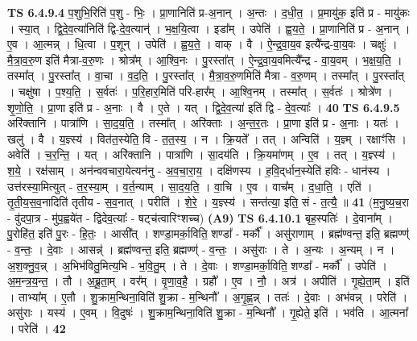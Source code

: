 \documentclass[17pt]{extarticle}
\begin{document}
                  \newline
                                \textbf{ TS 6.4.9.4} \newline
                  प॒शुभि॒रिति॑ प॒शु - भिः॒ । प्रा॒णानिति॑ प्र-अ॒नान् । अ॒न्तः । द॒धी॒त॒ । प्र॒मायु॑क॒ इति॑ प्र - मायु॑कः । स्या॒त् । द्वि॒दे॒व॒त्या॑निति॑ द्वि-दे॒व॒त्यान्॑ । भ॒क्ष॒यि॒त्वा । इडा᳚म् । उपेति॑ । ह्व॒य॒ते॒ । प्रा॒णानिति॑ प्र - अ॒नान् । ए॒व । आ॒त्मन्न् । धि॒त्वा । प॒शून् । उपेति॑ । ह्व॒य॒ते॒ । वाक् । वै । ऐ॒न्द्र॒वा॒य॒व इत्यै᳚न्द्र-वा॒य॒वः । चक्षुः॑ । मै॒त्रा॒व॒रु॒ण इति॑ मैत्रा-व॒रु॒णः । श्रोत्र᳚म् । आ॒श्वि॒नः । पु॒रस्ता᳚त् । ऐ॒न्द्र॒वा॒य॒वमित्यै᳚न्द्र - वा॒य॒वम् । भ॒क्ष॒य॒ति॒ । तस्मा᳚त् । पु॒रस्ता᳚त् । वा॒चा । व॒द॒ति॒ । पु॒रस्ता᳚त् । मै॒त्रा॒व॒रु॒णमिति॑ मैत्रा - व॒रु॒णम् । तस्मा᳚त् । पु॒रस्ता᳚त् । चक्षु॑षा । प॒श्य॒ति॒ । स॒र्वतः॑ । प॒रि॒हार॒मिति॑ परि-हार᳚म् । आ॒श्वि॒नम् । तस्मा᳚त् । स॒र्वतः॑ । श्रोत्रे॑ण । शृ॒णो॒ति॒ । प्रा॒णा इति॑ प्र - अ॒नाः । वै । ए॒ते । यत् । द्वि॒दे॒व॒त्या॑ इति॑ द्वि - दे॒व॒त्याः᳚ । \textbf{  40} \newline
                  \newline
                                \textbf{ TS 6.4.9.5} \newline
                  अरि॑क्तानि । पात्रा॑णि । सा॒द॒य॒ति॒ । तस्मा᳚त् । अरि॑क्ताः । अ॒न्त॒र॒तः । प्रा॒णा इति॑ प्र - अ॒नाः । यतः॑ । खलु॑ । वै । य॒ज्ञ्स्य॑ । वित॑त॒स्येति॒ वि - त॒त॒स्य॒ । न । क्रि॒यते᳚ । तत् । अन्विति॑ । य॒ज्ञ्म् । रक्षाꣳ॑सि । अवेति॑ । च॒र॒न्ति॒ । यत् । अरि॑क्तानि । पात्रा॑णि । सा॒दय॑ति । क्रि॒यमा॑णम् । ए॒व । तत् । य॒ज्ञ्स्य॑ । श॒ये॒ । रक्ष॑साम् । अन॑न्ववचारा॒येत्यन॑नु - अ॒व॒चा॒रा॒य॒ । दक्षि॑णस्य । ह॒वि॒द्‌र्धान॒स्येति॑ हविः - धान॑स्य । उत्त॑रस्या॒मित्युत् - त॒र॒स्या॒म् । व॒र्त॒न्याम् । सा॒द॒य॒ति॒ । वा॒चि । ए॒व । वाच᳚म् । द॒धा॒ति॒ । एति॑ । तृ॒ती॒य॒स॒व॒नादिति॑ तृतीय - स॒व॒नात् । परीति॑ । शे॒रे॒ । य॒ज्ञ्स्य॑ । सन्त॑त्या॒ इति॒ सं - त॒त्यै॒ ॥ \textbf{  41} \newline
                  \newline
                      (म॒नु॒ष्य॒च॒रा - वु॑दपा॒त्र - मु॑प॒ह्वये॑त - द्विदेव॒त्याः᳚ - षट्च॑त्वारिꣳशच्च)  \textbf{(A9)} \newline \newline
                                \textbf{ TS 6.4.10.1} \newline
                  बृह॒स्पतिः॑ । दे॒वाना᳚म् । पु॒रोहि॑त॒ इति॑ पु॒रः - हि॒तः॒ । आसी᳚त् । शण्डा॒मर्का॒विति॒ शण्डा᳚ - मर्कौ᳚ । असु॑राणाम् । ब्रह्म॑ण्वन्त॒ इति॒ ब्रह्मण्ण्॑ - व॒न्तः॒ । दे॒वाः । आसन्न्॑ । ब्रह्म॑ण्वन्त॒ इति॒ ब्रह्मण्ण्॑ - व॒न्तः॒ । असु॑राः । ते । अ॒न्यः । अ॒न्यम् । न । अ॒श॒क्नु॒व॒न्न् । अ॒भिभ॑वितु॒मित्य॒भि - भ॒वि॒तु॒म् । ते । दे॒वाः । शण्डा॒मर्का॒विति॒ शण्डा᳚ - मर्कौ᳚ । उपेति॑ । अ॒म॒न्त्र॒य॒न्त॒ । तौ । अ॒ब्रू॒ता॒म् । वर᳚म् । वृ॒णा॒व॒है॒ । ग्रहौ᳚ । ए॒व । नौ॒ । अत्र॑ । अपीति॑ । गृ॒ह्ये॒ता॒म् । इति॑ । ताभ्या᳚म् । ए॒तौ । शु॒क्राम॒न्थिना॒विति॑ शु॒क्रा - म॒न्थिनौ᳚ । अ॒गृ॒ह्ण॒न्न् । ततः॑ । दे॒वाः । अभ॑वन्न् । परेति॑ । असु॑राः । यस्य॑ । ए॒वम् । वि॒दुषः॑ । शु॒क्राम॒न्थिना॒विति॑ शु॒क्रा - म॒न्थिनौ᳚ । गृ॒ह्येते॒ इति॑ । भव॑ति । आ॒त्मना᳚ । परेति॑ । \textbf{  42} \newline
\end{document}
